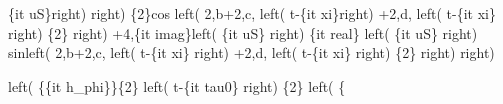 \begin{maplegroup}
\{it uS\}right)  right) \{2\}cos left( 2,b+2,c, left( t-\{it xi\}right) +2,d, left( t-\{it xi\} right) \{2\} right) +4,\{it imag\}left( \{it uS\} right) \{it real\} left( \{it uS\} right) sinleft( 2,b+2,c, left( t-\{it xi\} right) +2,d, left( t-\{it xi\} right) \{2\} right)  right)\end{maplegroup}
\begin{maplegroup}
\begin{mapleinput}
\end{mapleinput}
\mapleresult
{}left( \{\{it h\_phi\}\}\{2\} left( t-\{it tau0\} right) \{2\} left( \{

\end{maplegroup}
